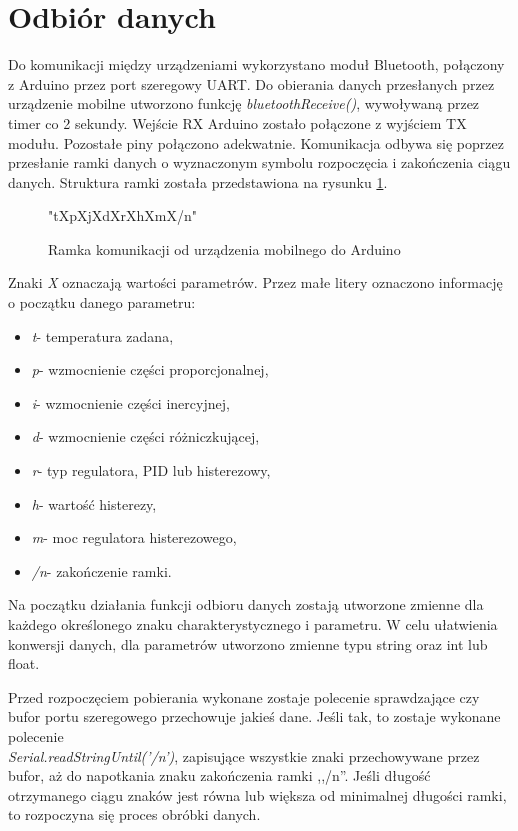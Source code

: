 \section{Odbiór danych}%
Do komunikacji między urządzeniami wykorzystano moduł Bluetooth, połączony z Arduino przez port szeregowy UART. Do obierania danych przesłanych przez urządzenie mobilne utworzono funkcję \textit{bluetoothReceive()}, wywoływaną przez timer co 2 sekundy. Wejście RX Arduino zostało połączone z wyjściem TX modułu. Pozostałe piny połączono adekwatnie. Komunikacja odbywa się poprzez przesłanie ramki danych o wyznaczonym symbolu rozpoczęcia i zakończenia ciągu danych. Struktura ramki została przedstawiona na rysunku \ref{ramka1}.
\begin{figure}[H]
\centering
\Huge "tXpXjXdXrXhXmX/n"
\label{ramka1}
\caption{Ramka komunikacji od urządzenia mobilnego do Arduino}
\end{figure}
Znaki \textit{X} oznaczają wartości parametrów. Przez małe litery oznaczono informację o początku danego parametru:
\begin{itemize}
\item \textit{t}- temperatura zadana,
\item \textit{p}- wzmocnienie części proporcjonalnej,
\item \textit{i}- wzmocnienie części inercyjnej,
\item \textit{d}- wzmocnienie części różniczkującej,
\item \textit{r}- typ regulatora, PID lub histerezowy,
\item \textit{h}- wartość histerezy,
\item \textit{m}- moc regulatora histerezowego,
\item \textit{/n}- zakończenie ramki.
\end{itemize}
Na początku działania funkcji odbioru danych zostają utworzone zmienne dla każdego określonego znaku charakterystycznego i parametru. W celu ułatwienia konwersji danych, dla parametrów utworzono zmienne typu string oraz int lub float.

Przed rozpoczęciem pobierania wykonane zostaje polecenie sprawdzające czy bufor portu szeregowego przechowuje jakieś dane. Jeśli tak, to zostaje wykonane polecenie \\ \textit{Serial.readStringUntil('/n')}, zapisujące wszystkie znaki przechowywane przez bufor, aż do napotkania znaku zakończenia ramki ,,/n''. Jeśli długość otrzymanego ciągu znaków jest równa lub większa od minimalnej długości ramki, to rozpoczyna się proces obróbki danych.

